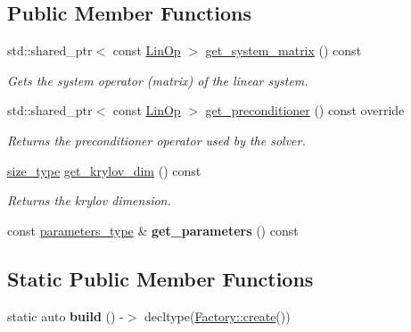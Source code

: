 \subsection*{Public Member Functions}
\begin{DoxyCompactItemize}
\item 
std\+::shared\+\_\+ptr$<$ const \hyperlink{classgko_1_1LinOp}{Lin\+Op} $>$ \hyperlink{classgko_1_1solver_1_1Gmres_a31d5c0225dbed72e52ea252dd38868f2}{get\+\_\+system\+\_\+matrix} () const
\begin{DoxyCompactList}\small\item\em Gets the system operator (matrix) of the linear system. \end{DoxyCompactList}\item 
std\+::shared\+\_\+ptr$<$ const \hyperlink{classgko_1_1LinOp}{Lin\+Op} $>$ \hyperlink{classgko_1_1solver_1_1Gmres_ac2e3e0024a37647eda9f8a7f5b4cefb4}{get\+\_\+preconditioner} () const override
\begin{DoxyCompactList}\small\item\em Returns the preconditioner operator used by the solver. \end{DoxyCompactList}\item 
\hyperlink{namespacegko_a6e5c95df0ae4e47aab2f604a22d98ee7}{size\+\_\+type} \hyperlink{classgko_1_1solver_1_1Gmres_a3a808fe82cdd1e988667a89d6982e740}{get\+\_\+krylov\+\_\+dim} () const
\begin{DoxyCompactList}\small\item\em Returns the krylov dimension. \end{DoxyCompactList}\item 
\mbox{\label{classgko_1_1solver_1_1Gmres_a54a7453e1f9106f5b6d4373ecd1a493f}} 
const \hyperlink{structgko_1_1solver_1_1Gmres_1_1parameters__type}{parameters\+\_\+type} \& {\bfseries get\+\_\+parameters} () const
\end{DoxyCompactItemize}
\subsection*{Static Public Member Functions}
\begin{DoxyCompactItemize}
\item 
\mbox{\label{classgko_1_1solver_1_1Gmres_aa00760a654ed5a50893262b6009e9b44}} 
static auto {\bfseries build} () -\/$>$ decltype(\hyperlink{classgko_1_1EnableDefaultFactory_a1d077101d9e788e6c65f088612d14cc3}{Factory\+::create}())
\end{DoxyCompactItemize}
